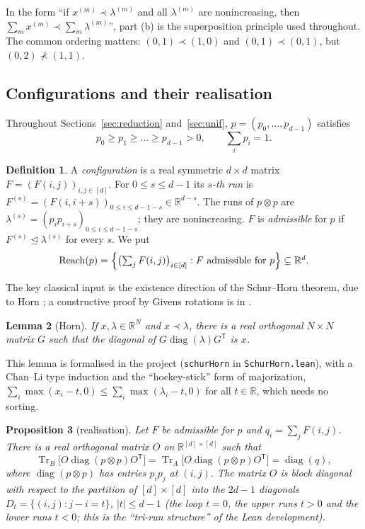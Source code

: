 \documentclass[11pt]{amsart}
\newtheorem{lemma}{Lemma}[section]
\newtheorem{proposition}[lemma]{Proposition}
\theoremstyle{definition}
\newtheorem{definition}[lemma]{Definition}
\theoremstyle{remark}
\numberwithin{equation}{section}
\newcommand{\R}{\mathbb{R}}
\newcommand{\Tr}{\operatorname{Tr}}
\newcommand{\diag}{\operatorname{diag}}
\newcommand{\Reach}{\operatorname{Reach}}
\newcommand{\dom}{\trianglelefteq}
\newcommand{\lean}[1]{\texttt{#1}}
\begin{document}
In the form ``if $x^{(m)}\prec\lambda^{(m)}$ and all $\lambda^{(m)}$ are nonincreasing, then
$\sum_m x^{(m)}\prec\sum_m\lambda^{(m)}$'', part (b) is the superposition principle used throughout.
The common ordering matters: $(0,1)\prec(1,0)$ and $(0,1)\prec(0,1)$, but $(0,2)\not\prec(1,1)$.

\subsection{Configurations and their realisation}
Throughout Sections~\ref{sec:reduction} and~\ref{sec:unif}, $p=(p_0,\dots,p_{d-1})$ satisfies
\[
  p_0\ge p_1\ge\dots\ge p_{d-1}>0,\qquad \sum_{i}p_i=1 .
\]

\begin{definition}\label{def:config}
A \emph{configuration} is a real symmetric $d\times d$ matrix $F=(F(i,j))_{i,j\in[d]}$. For
$0\le s\le d-1$ its \emph{$s$-th run} is $F^{(s)}=(F(i,i+s))_{0\le i\le d-1-s}\in\R^{d-s}$. The runs
of $p\otimes p$ are $\lambda^{(s)}=(p_ip_{i+s})_{0\le i\le d-1-s}$; they are nonincreasing. $F$ is
\emph{admissible} for $p$ if $F^{(s)}\dom\lambda^{(s)}$ for every $s$. We put
\[
  \Reach(p)=\Bigl\{\bigl(\textstyle\sum_{j}F(i,j)\bigr)_{i\in[d]} : F\text{ admissible for }p\Bigr\}\subseteq\R^d .
\]
\end{definition}

The key classical input is the existence direction of the Schur--Horn theorem, due to Horn
\cite{Schur1923,Horn1954}; a constructive proof by Givens rotations is in \cite{ChanLi1983}.

\begin{lemma}[Horn]\label{lem:horn}
If $x,\lambda\in\R^N$ and $x\prec\lambda$, there is a real orthogonal $N\times N$ matrix $G$ such
that the diagonal of $G\diag(\lambda)G^{\mathsf T}$ is $x$.
\end{lemma}

This lemma is formalised in the project (\lean{schurHorn} in \lean{SchurHorn.lean}), with a
Chan--Li type induction and the ``hockey-stick'' form of majorization,
$\sum_i\max(x_i-t,0)\le\sum_i\max(\lambda_i-t,0)$ for all $t\in\R$, which needs no sorting.

\begin{proposition}[realisation]\label{prop:realisation}
Let $F$ be admissible for $p$ and $q_i=\sum_jF(i,j)$. There is a real orthogonal matrix $O$ on
$\R^{[d]\times[d]}$ such that
\[
  \Tr_B\bigl[O\diag(p\otimes p)O^{\mathsf T}\bigr]=\Tr_A\bigl[O\diag(p\otimes p)O^{\mathsf T}\bigr]=\diag(q) ,
\]
where $\diag(p\otimes p)$ has entries $p_ip_j$ at $(i,j)$. The matrix $O$ is block diagonal with respect
to the partition of $[d]\times[d]$ into the $2d-1$ diagonals $D_t=\{(i,j):j-i=t\}$, $|t|\le d-1$ (the
loop $t=0$, the upper runs $t>0$ and the lower runs $t<0$; this is the ``tri-run structure'' of the
Lean development).
\end{proposition}
\end{document}
